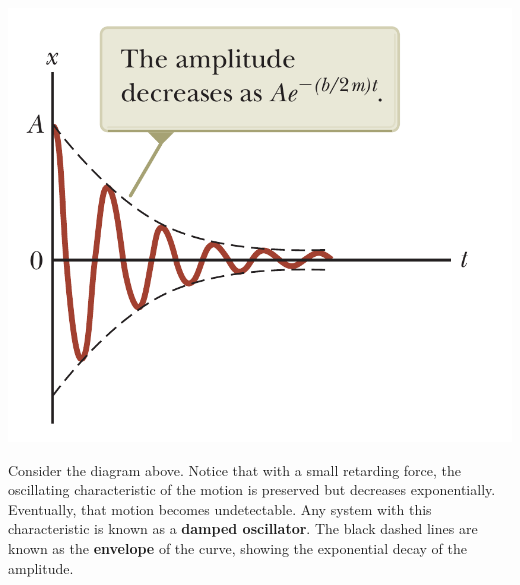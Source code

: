 \begin{center}
    \includegraphics[scale=0.3]{images/oaw/damped01}
\end{center}

Consider the diagram above. Notice that with a small retarding force, the oscillating characteristic
of the motion is preserved but decreases exponentially. Eventually, that motion becomes undetectable.
Any system with this characteristic is known as a \textbf{damped oscillator}. The black dashed lines
are known as the \textbf{envelope} of the curve, showing the exponential decay of the amplitude.


